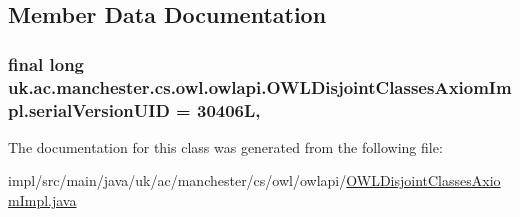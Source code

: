 \subsection{Member Data Documentation}
\hypertarget{classuk_1_1ac_1_1manchester_1_1cs_1_1owl_1_1owlapi_1_1_o_w_l_disjoint_classes_axiom_impl_aa1003fee4d74ed6484b392ba1ee0d8ca}{
\subsubsection[{serial\-Version\-U\-I\-D}]{\setlength{\rightskip}{0pt plus 5cm}final long uk.\-ac.\-manchester.\-cs.\-owl.\-owlapi.\-O\-W\-L\-Disjoint\-Classes\-Axiom\-Impl.\-serial\-Version\-U\-I\-D = 30406\-L\hspace{0.3cm}{\ttfamily [static]}, {\ttfamily [private]}}}\label{classuk_1_1ac_1_1manchester_1_1cs_1_1owl_1_1owlapi_1_1_o_w_l_disjoint_classes_axiom_impl_aa1003fee4d74ed6484b392ba1ee0d8ca}


The documentation for this class was generated from the following file\-:\begin{DoxyCompactItemize}
\item 
impl/src/main/java/uk/ac/manchester/cs/owl/owlapi/\hyperlink{_o_w_l_disjoint_classes_axiom_impl_8java}{O\-W\-L\-Disjoint\-Classes\-Axiom\-Impl.\-java}\end{DoxyCompactItemize}
